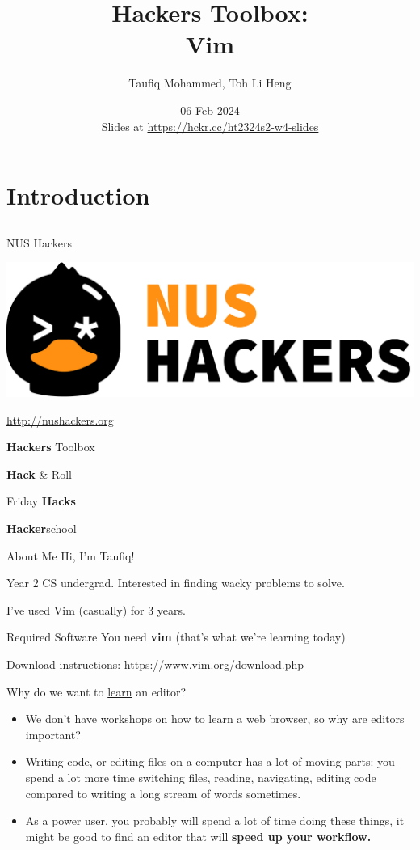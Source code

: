 \documentclass[12pt]{beamer}
\title{Hackers Toolbox: \\Vim}
\author{Taufiq Mohammed, Toh Li Heng}
\date{06 Feb 2024 \\ Slides at \url{https://hckr.cc/ht2324s2-w4-slides}}
\begin{document}
\frame[plain]{\titlepage}

\section{Introduction}
\subsection{}

\begin{frame}{NUS Hackers}

    \begin{center}
        \includegraphics[width=0.5\linewidth]{../NUSHackers}

        \url{http://nushackers.org}
    \end{center}

    \begin{center}
        \textbf{Hackers} Toolbox

        \textbf{Hack} \& Roll

        Friday \textbf{Hacks}

        \textbf{Hacker}school
    \end{center}

\end{frame}

\begin{frame}{About Me}
    Hi, I'm Taufiq!

    Year 2 CS undergrad. Interested in finding wacky problems to solve.

    I've used Vim (casually) for 3 years.
\end{frame}

\begin{frame}{Required Software}
    You need \textbf{vim} (that's what we're learning today)

    Download instructions: \url{https://www.vim.org/download.php}
\end{frame}

\begin{frame}{Why do we want to \underline{learn} an editor?}
    \begin{itemize}
        \item We don't have workshops on how to learn a web browser, so why are editors important?
        \item Writing code, or editing files on a computer has a lot of moving parts: you spend a lot more time switching files, reading, navigating, editing code compared to writing a long stream of words sometimes.
        \item As a power user, you probably will spend a lot of time doing these things, it might be good to find an editor that will \textbf{speed up your workflow.}
    \end{itemize}
\end{frame}
\end{document}
